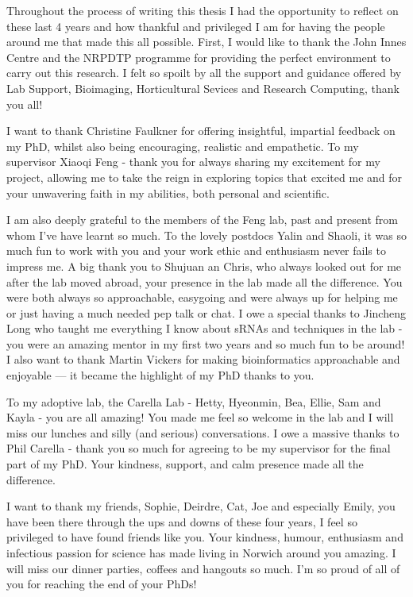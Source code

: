 
\begin{acknowledgements}      

Throughout the process of writing this thesis I had the opportunity to reflect on these last 4 years and how thankful and privileged I am for having the people around me that made this all possible. First, I would like to thank the John Innes Centre and the NRPDTP programme for providing the perfect environment to carry out this research. I felt so spoilt by all the support and guidance offered by Lab Support, Bioimaging, Horticultural Sevices and Research Computing, thank you all!

I want to thank Christine Faulkner for offering insightful, impartial feedback on my PhD, whilst also being encouraging, realistic and empathetic. To my supervisor Xiaoqi Feng - thank you for always sharing my excitement for my project, allowing me to take the reign in exploring topics that excited me and for your unwavering faith in my abilities, both personal and scientific. 

I am also deeply grateful to the members of the Feng lab, past and present from whom I've have learnt so much. To the lovely postdocs Yalin and Shaoli, it was so much fun to work with you and your work ethic and enthusiasm never fails to impress me. A big thank you to Shujuan an Chris, who always looked out for me after the lab moved abroad, your presence in the lab made all the difference. You were both always so approachable, easygoing and were always up for helping me or just having a much needed pep talk or chat. I owe a special thanks to Jincheng Long who taught me everything I know about sRNAs and techniques in the lab - you were an amazing mentor in my first two years and so much fun to be around!  I also want to thank Martin Vickers for making bioinformatics approachable and enjoyable — it became the highlight of my PhD thanks to you.

To my adoptive lab, the Carella Lab -  Hetty, Hyeonmin, Bea, Ellie, Sam and Kayla - you are all amazing! You made me feel so welcome in the lab and I will miss our lunches and silly (and serious) conversations. I owe a massive thanks to Phil Carella - thank you so much for agreeing to be my supervisor for the final part of my PhD. Your kindness, support, and calm presence made all the difference.

I want to thank my friends, Sophie, Deirdre, Cat, Joe and especially Emily, you have been there through the ups and downs of these four years, I feel so privileged to have found friends like you. Your kindness, humour, enthusiasm and infectious passion for science has made living in Norwich around you amazing. I will miss our dinner parties, coffees and hangouts so much. I’m so proud of all of you for reaching the end of your PhDs!


\end{acknowledgements}
